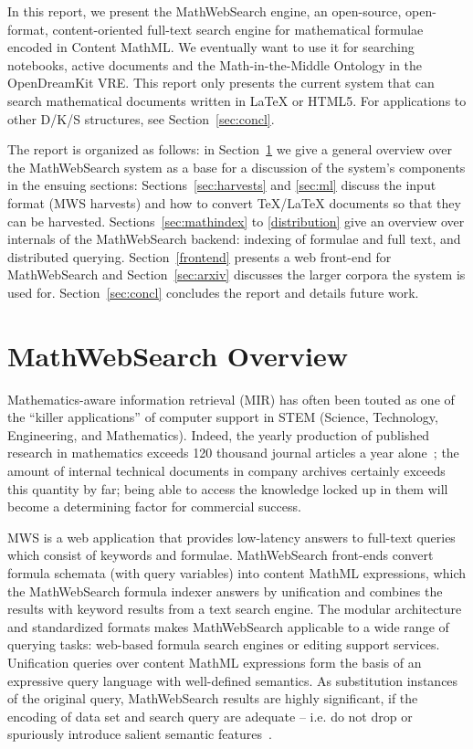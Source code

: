 \documentclass{deliverablereport}
\def\pn{OpenDreamKit\xspace}
\def\MWS{\textsf{MathWebSearch}\xspace}
\begin{document}
In this report, we present the \MWS engine, an open-source, open-format,
content-oriented full-text search engine for mathematical formulae encoded in Content
MathML. We eventually want to use it for searching notebooks, active documents and the
Math-in-the-Middle Ontology in the \pn VRE. This report only presents the current system
that can search mathematical documents written in {\LaTeX} or HTML5. For applications to
other D/K/S structures, see Section~\ref{sec:concl}.
 
The report is organized as follows: in Section~\ref{sec:mws} we give a general overview
over the \MWS system as a base for a discussion of the system's components in the
ensuing sections: Sections~\ref{sec:harvests} and \ref{sec:ml} discuss the input format
(MWS harvests) and how to convert {\TeX/\LaTeX} documents so that they can be
harvested. Sections~\ref{sec:mathindex} to \ref{distribution} give an overview over
internals of the \MWS backend: indexing of formulae and full text, and
distributed querying. Section~\ref{frontend} presents a web front-end for \MWS
and Section~\ref{sec:arxiv} discusses the larger corpora the system is used for.
Section~\ref{sec:concl} concludes the report and details future work.

\section{\MWS Overview}\label{sec:mws}

Mathematics-aware information retrieval (MIR) has often been touted as one of the “killer
applications” of computer support in STEM (Science, Technology, Engineering, and
Mathematics). Indeed, the yearly production of published research in mathematics exceeds
120 thousand journal articles a year alone~\cite{KohProHam:ntcir11}; the amount of
internal technical documents in company archives certainly exceeds this quantity by far;
being able to access the knowledge locked up in them will become a determining factor for
commercial success.

MWS is a web application that provides low-latency answers to full-text queries which
consist of keywords and formulae. \MWS front-ends convert formula schemata (with query
variables) into content MathML expressions, which the \MWS formula indexer answers by
unification and combines the results with keyword results from a text search engine. The
modular architecture and standardized formats makes \MWS applicable to a wide range of
querying tasks: web-based formula search engines or editing support services. Unification
queries over content MathML expressions form the basis of an expressive query language
with well-defined semantics. As substitution instances of the original query, \MWS results
are highly significant, if the
encoding of data set and search query are adequate – i.e. do not drop or spuriously
introduce salient semantic features~\cite{KohProHam:ntcir11}.
\end{document}
